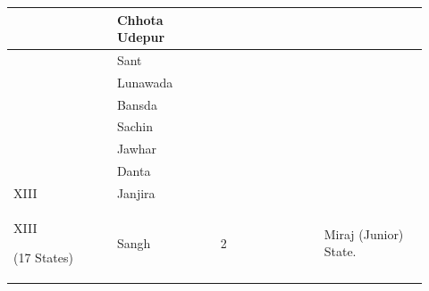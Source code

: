 \begin{longtable}{|p{0.23\linewidth}|p{0.23\linewidth}|p{0.23\linewidth}|p{0.23\linewidth}|}
 \\
\hline
 & Chhota Udepur

 \\
\hline
 & Sant

 \\
\hline
 & Lunawada

 \\
\hline
 & Bansda

 \\
\hline
 & Sachin

 \\
\hline
 & Jawhar

 \\
\hline
 & Danta

 \\
\hline
XIII

 & Janjira

 \\
\hline
\multirow{14}{*}{XIII











(17 States)















} & Sangh

 & \multirow{17}{*}{











2





















} & \multirow{17}{*}{











Miraj (Junior) State.





















}
\end{longtable}
